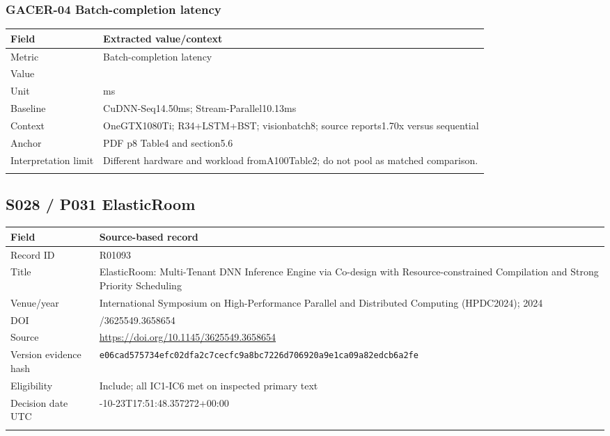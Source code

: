 \subsubsection*{GACER-04 Batch-completion latency}
\begin{longtable}{>{\raggedright\arraybackslash}p{}>{\raggedright\arraybackslash}p{}}
\toprule
\textbf{Field} & \textbf{Extracted value/context}\\\midrule\endhead
Metric & Batch-completion latency\\\addlinespace
Value & 8.51\\\addlinespace
Unit & ms\\\addlinespace
Baseline & CuDNN-Seq14.50ms;\allowbreak{} Stream-Parallel10.13ms\\\addlinespace
Context & OneGTX1080Ti;\allowbreak{} R34+LSTM+BST;\allowbreak{} visionbatch8;\allowbreak{} source reports1.70x versus sequential\\\addlinespace
Anchor & PDF p8 Table4 and section5.6\\\addlinespace
Interpretation limit & Different hardware and workload fromA100Table2;\allowbreak{} do not pool as matched comparison.\\\addlinespace
\bottomrule\end{longtable}
\clearpage\subsection{S028 / P031 ElasticRoom}
\cite{s028}
\begin{longtable}{>{\raggedright\arraybackslash}p{}>{\raggedright\arraybackslash}p{}}
\toprule
\textbf{Field} & \textbf{Source-based record}\\\midrule\endhead
Record ID & R01093\\\addlinespace
Title & ElasticRoom: Multi-Tenant DNN Inference Engine via Co-design with Resource-constrained Compilation and Strong Priority Scheduling\\\addlinespace
Venue/year & International Symposium on High-Performance Parallel and Distributed Computing (HPDC2024);\allowbreak{} 2024\\\addlinespace
DOI & 10.1145/3625549.3658654\\\addlinespace
Source & \url{https://doi.org/10.1145/3625549.3658654}\\\addlinespace
Version evidence hash & \nolinkurl{e06cad575734efc02dfa2c7cecfc9a8bc7226d706920a9e1ca09a82edcb6a2fe}\\\addlinespace
Eligibility & Include;\allowbreak{} all IC1-IC6 met on inspected primary text\\\addlinespace
Decision date UTC & 2026-10-23T17:51:48.357272+00:00\\\addlinespace
\bottomrule\end{longtable}
